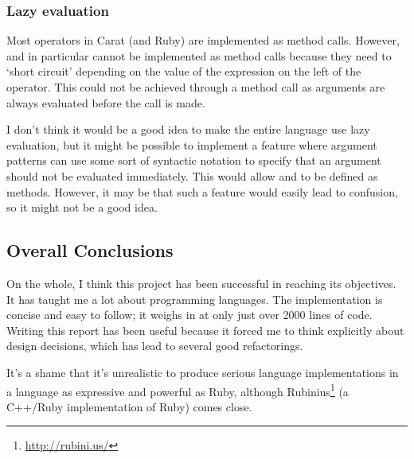 \subsubsection{Lazy evaluation}

Most operators in Carat (and Ruby) are implemented as method calls. However, \code{&&} and \code{||} in particular cannot be implemented as method calls because they need to `short circuit' depending on the value of the expression on the left of the operator. This could not be achieved through a method call as arguments are always evaluated before the call is made.

I don't think it would be a good idea to make the entire language use lazy evaluation, but it might be possible to implement a feature where argument patterns can use some sort of syntactic notation to specify that an argument should not be evaluated immediately. This would allow \code{&&} and \code{||} to be defined as methods. However, it may be that such a feature would easily lead to confusion, so it might not be a good idea.

\subsection{Overall Conclusions}

On the whole, I think this project has been successful in reaching its objectives. It has taught me a lot about programming languages. The implementation is concise and easy to follow; it weighs in at only just over 2000 lines of code. Writing this report has been useful because it forced me to think explicitly about design decisions, which has lead to several good refactorings.

It's a shame that it's unrealistic to produce serious language implementations in a language as expressive and powerful as Ruby, although Rubinius\footnote{\url{http://rubini.us/}} (a C++/Ruby implementation of Ruby) comes close.
